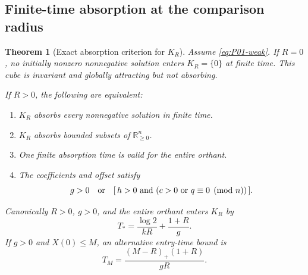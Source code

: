\documentclass[11pt]{article}
\newcommand{\R}{\mathbb{R}}
\newcommand{\Orth}{\R_{\geq 0}^{n}}
\newtheorem{theorem}{Theorem}[section]
\theoremstyle{definition}
\theoremstyle{remark}
\begin{document}
\subsection{Finite-time absorption at the comparison radius}
\label{slot:P01-3}

\begin{theorem}[Exact absorption criterion for $K_R$]
\label{thm:P01-absorption}
Assume \eqref{eq:P01-weak}. If $R=0$, no initially nonzero nonnegative
solution enters $K_R=\{0\}$ at finite time. This cube is invariant and
globally attracting but not absorbing.

If $R>0$, the following are equivalent:
\begin{enumerate}[label=(\roman*),leftmargin=*]
\item $K_R$ absorbs every nonnegative solution in finite time.
\item $K_R$ absorbs bounded subsets of $\Orth$.
\item One finite absorption time is valid for the entire orthant.
\item The coefficients and offset satisfy
\begin{equation}
\label{eq:P01-absorption-criterion}
 g>0\quad\hbox{or}\quad
 [\,h>0\ \hbox{and}\ (c>0\ \hbox{or}\ q\equiv0\pmod n)\,].
\end{equation}
\end{enumerate}
Canonically $R>0$, $g>0$, and the entire orthant enters $K_R$ by
\begin{equation}
\label{eq:P01-canonical-time}
 T_*=\frac{\log2}{kR}+\frac{1+R}{g}.
\end{equation}
If $g>0$ and $X(0)\le M$, an alternative entry-time bound is
\begin{equation}
\label{eq:P01-bounded-time}
 T_M=\frac{(M-R)_+(1+R)}{gR}.
\end{equation}
\end{theorem}
\end{document}

